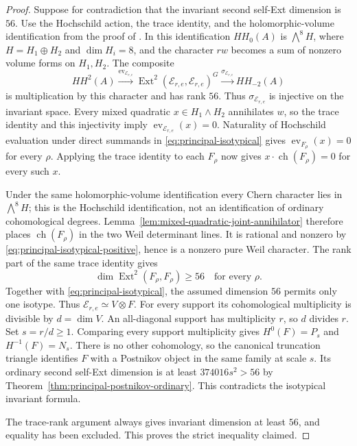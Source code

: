 \documentclass[11pt]{article}
\makeatletter
\providecommand{\compref}[1]{\csname external@#1\endcsname}
\theoremstyle{definition}
\theoremstyle{remark}
\makeatother
\begin{document}
\begin{proof}
Suppose for contradiction that the invariant second self-Ext
dimension is $56$.  Use the Hochschild action, the trace
identity, and the holomorphic-volume identification from the
proof of \cite[Theorem~\compref{thm:pure-weil-ext}]{CompanionA}.
In this identification $HH_0(A)$ is $\bigwedge^8 H$, where
$H=H_1\oplus H_2$ and $\dim H_i=8$, and the character $rw$ becomes a sum of
nonzero volume forms on $H_1,H_2$.
The composite
\[
 HH^2(A)\xrightarrow{\operatorname{ev}_{\mathcal E_{r,e}}}
 \operatorname{Ext}^2(\mathcal E_{r,e},\mathcal E_{r,e})^G
 \xrightarrow{\sigma_{\mathcal E_{r,e}}}HH_{-2}(A)
\]
is multiplication by this character and has rank $56$.
Thus $\sigma_{\mathcal E_{r,e}}$ is injective on the invariant
space.  Every mixed quadratic $x\in H_1\wedge H_2$ annihilates
$w$, so the trace identity and this injectivity imply
$\operatorname{ev}_{\mathcal E_{r,e}}(x)=0$.
Naturality of Hochschild evaluation under direct summands
in \eqref{eq:principal-isotypical} gives
$\operatorname{ev}_{F_\rho}(x)=0$ for every $\rho$.
Applying the trace identity to each $F_\rho$ now gives
$x\cdot\operatorname{ch}(F_\rho)=0$ for every such $x$.

Under the same holomorphic-volume identification every Chern
character lies in $\bigwedge^8H$; this is the Hochschild
identification, not an identification of ordinary cohomological
degrees.  Lemma~\ref{lem:mixed-quadratic-joint-annihilator}
therefore places $\operatorname{ch}(F_\rho)$ in the two Weil
determinant lines.  It is rational and nonzero by
\eqref{eq:principal-isotypical-positive}, hence is a nonzero
pure Weil character.  The rank part of the same trace identity
gives
\[
 \dim\operatorname{Ext}^2(F_\rho,F_\rho)\geq56
 \quad\text{for every }\rho.
\]
Together with \eqref{eq:principal-isotypical}, the assumed
dimension $56$ permits only one isotype.  Thus
$\mathcal E_{r,e}\simeq V\otimes F$.
For every support its cohomological multiplicity is divisible
by $d=\dim V$.  An all-diagonal support has multiplicity $r$,
so $d$ divides $r$.  Set $s=r/d\geq1$.  Comparing every support
multiplicity gives $H^0(F)=P_s$ and $H^{-1}(F)=N_s$.
There is no other cohomology, so the canonical truncation triangle
identifies $F$ with a Postnikov object in the same family at scale
$s$.  Its ordinary second self-Ext dimension is at least
$374016s^2>56$ by Theorem~\ref{thm:principal-postnikov-ordinary}.
This contradicts the isotypical invariant formula.

The trace-rank argument always gives invariant dimension at
least $56$, and equality has been excluded.  This proves the
strict inequality claimed.
\end{proof}
\end{document}
